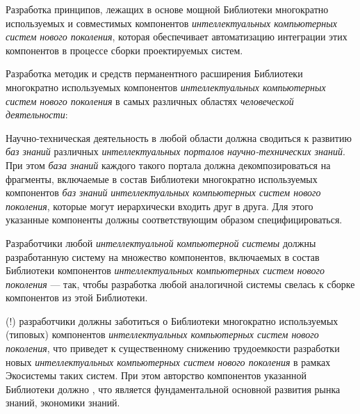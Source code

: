 \begin{textitemize}
	\medskip
	\item Разработка принципов, лежащих в основе мощной Библиотеки многократно используемых и совместимых компонентов \textit{интеллектуальных компьютерных систем нового поколения}, которая обеспечивает  автоматизацию интеграции этих компонентов в процессе сборки проектируемых систем.
	\item Разработка методик и средств перманентного расширения Библиотеки многократно используемых компонентов \textit{интеллектуальных компьютерных систем нового поколения} в самых различных областях \textit{человеческой деятельности}:
	\begin{textitemize}
		\item Научно-техническая деятельность в любой области должна сводиться к развитию \textit{баз знаний} различных \textit{интеллектуальных порталов научно-технических знаний}. При этом \textit{база знаний} каждого такого портала должна декомпозироваться на фрагменты, включаемые в состав Библиотеки многократно используемых компонентов \textit{баз знаний} \textit{интеллектуальных компьютерных систем нового поколения}, которые могут иерархически входить друг в друга. Для этого указанные компоненты должны соответствующим образом специфицироваться.
		\item Разработчики любой \textit{интеллектуальной компьютерной системы} должны  разработанную систему на множество компонентов, включаемых в состав Библиотеки компонентов\textit{ интеллектуальных компьютерных систем нового поколения} --- так, чтобы разработка любой аналогичной системы свелась к сборке компонентов из этой Библиотеки.
		\item {}(!) разработчики должны заботиться о  Библиотеки многократно используемых (типовых) компонентов \textit{интеллектуальных компьютерных систем нового поколения}, что приведет к существенному снижению трудоемкости разработки новых \textit{интеллектуальных компьютерных систем нового поколения} в рамках Экосистемы таких систем. При этом авторство компонентов  указанной Библиотеки должно , что является фундаментальной основной развития рынка знаний, экономики знаний. 
		

\end{textitemize}
\end{textitemize}

